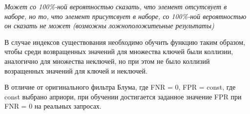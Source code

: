 
\textit{Может со 100\%-ной вероятностью сказать, что элемент отсутсвует в
наборе, но то, что элемент присутсвует в наборе, со 100\%-ной вероятностью он
сказать не может (возможны ложноположитеьные результаты)}

В случае индексов существования необходимо обучить функцию таким образом, чтобы
среди возвращенных значений для множества ключей были коллизии, аналогично для
множества неключей, но при этом не было коллизий возращенных значений для ключей
и неключей. 

В отличие от оригинального фильтра Блума, где FNR = 0, FPR = const, где const
выбрано априори, при обучении достигается заданное значение FPR при FNR = 0 на
реальных запросах.
